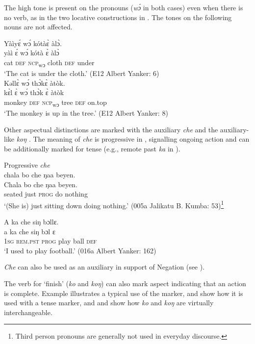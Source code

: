 The high tone is present on the pronouns (\textit{wɔ́} in both cases) even when there is no verb, as in the two locative constructions in . The tones on the following nouns are not affected.

\ea%
    \label{ex:114}
    \ea
    Yàìyɛ́ wɔ́ kótàɛ̀ àlɔ̀.\\
    \gll yàì ɛ́   wɔ́   kótà ɛ̀   àlɔ̀\\
      cat \textsc{def} \textsc{ncp}\textsubscript{wɔ} cloth \textsc{def} under\\
\glt ‘The cat is under the cloth.' (E12 Albert Yanker: 6)\\

\ex Kəllɛ̀ wɔ́ thɔ̀kɛ̀ àtòk.\\
\gll kɛ̀l     ɛ̀  wɔ́   thɔ̀k ɛ̀  àtòk\\
monkey \textsc{def} \textsc{ncp}\textsubscript{wɔ} tree \textsc{def} on.top\\
\glt ‘The monkey is up in the tree.' (E12 Albert Yanker: 8)
\z
\z

Other aspectual distinctions are marked with the auxiliary \textit{che}  and the auxiliary-like \textit{koŋ} . The meaning of \textit{che} is progressive in , signalling ongoing action and can be additionally marked for tense (e.g., remote past \textit{ka} in ).

\ea%
    \label{ex:115}
Progressive \textit{che}\\

\ea \label{ex:115a} chala bo che ŋaa beyen.\\
\gll Chala    bo    che  ŋaa  beyen.\\
      seated  just  \textsc{prog}  do    nothing\\
      \glt ‘(She is) just sitting down doing nothing.' (005a Jalikatu B. Kumba: 53)\footnote{Third person pronouns are generally not used in everyday discourse.}

\ex \label{ex:115b} A ka che siŋ bɔllɛ.\\
\gll a    ka      che  siŋ    bɔl  ɛ\\
\textsc{1sg}  \textsc{rem.pst}  \textsc{prog}  play  ball  \textsc{def}\\
\glt ‘I used to play football.' (016a Albert Yanker: 162)
\z
\z

\textit{Che} can also be used as an auxiliary in support of Negation (see ).

The verb for ‘finish' (\textit{ko} and \textit{koŋ}) can also mark aspect indicating that an action is complete. Example  illustrates a typical use of the marker,  and  show how it is used with a tense marker, and  and  show how \textit{ko} and \textit{koŋ} are virtually interchangeable.

